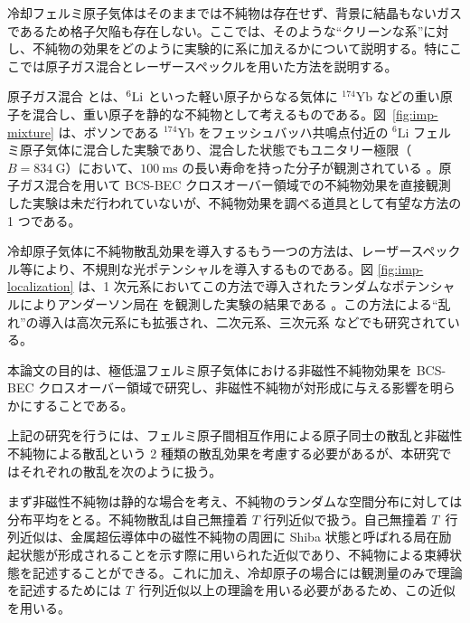 
冷却フェルミ原子気体はそのままでは不純物は存在せず、背景に結晶もないガスであるため格子欠陥も存在しない。ここでは、そのような“クリーンな系”に対し、不純物の効果をどのように実験的に系に加えるかについて説明する。特にここでは原子ガス混合とレーザースペックルを用いた方法を説明する。


原子ガス混合 \cite{kharamov2012,konishi2016,hansen2011,kharamov2013,kharamov2014,hara2014} とは、${}^6\mathrm{Li}$ といった軽い原子からなる気体に ${}^{174}\mathrm{Yb}$ などの重い原子を混合し、重い原子を静的な不純物として考えるものである。図~\ref{fig:imp-mixture} は、ボソンである ${}^{174}\mathrm{Yb}$ をフェッシュバッハ共鳴点付近の ${}^{6}\mathrm{Li}$ フェルミ原子気体に混合した実験であり、混合した状態でもユニタリー極限（$B=834\ \mathrm{G}$）において、$100\ \mathrm{ms}$ の長い寿命を持った分子が観測されている \cite{kharamov2012}。原子ガス混合を用いて BCS-BEC クロスオーバー領域での不純物効果を直接観測した実験は未だ行われていないが、不純物効果を調べる道具として有望な方法の 1 つである。


冷却原子気体に不純物散乱効果を導入するもう一つの方法は、レーザースペックル等により、不規則な光ポテンシャルを導入するものである。図 \ref{fig:imp-localization} は、1 次元系においてこの方法で導入されたランダムなポテンシャルによりアンダーソン局在 \cite{andersonlocal1958} を観測した実験の結果である \cite{billy2008}。この方法による“乱れ”の導入は高次元系にも拡張され、二次元系\cite{robert2010}、三次元系\cite{Kondov2011,Jendrzejewski2011} などでも研究されている。



本論文の目的は、極低温フェルミ原子気体における非磁性不純物効果を BCS-BEC クロスオーバー領域で研究し、非磁性不純物が対形成に与える影響を明らかにすることである。

上記の研究を行うには、フェルミ原子間相互作用による原子同士の散乱と非磁性不純物による散乱という 2 種類の散乱効果を考慮する必要があるが、本研究ではそれぞれの散乱を次のように扱う。

まず非磁性不純物は静的な場合を考え、不純物のランダムな空間分布に対しては分布平均をとる。不純物散乱は自己無撞着 $T$ 行列近似で扱う。自己無撞着 $T$~行列近似は、金属超伝導体中の磁性不純物の周囲に Shiba 状態と呼ばれる局在励起状態が形成されることを示す際に用いられた近似であり、不純物による束縛状態を記述することができる。これに加え、冷却原子の場合には観測量のみで理論を記述するためには $T$~行列近似以上の理論を用いる必要があるため、この近似を用いる。

